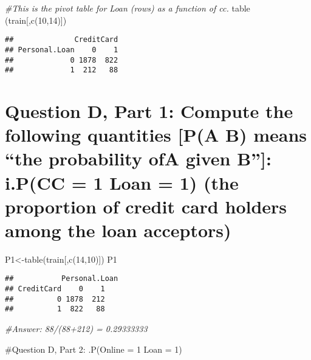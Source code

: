 \documentclass[
]{article}
\newenvironment{Shaded}{\begin{snugshade}}{\end{snugshade}}
\newcommand{\CommentTok}[1]{\textcolor[rgb]{0.56,0.35,0.01}{\textit{#1}}}
\newcommand{\DecValTok}[1]{\textcolor[rgb]{0.00,0.00,0.81}{#1}}
\newcommand{\FunctionTok}[1]{\textcolor[rgb]{0.00,0.00,0.00}{#1}}
\newcommand{\NormalTok}[1]{#1}
\newcommand{\OtherTok}[1]{\textcolor[rgb]{0.56,0.35,0.01}{#1}}
\begin{document}
\begin{Shaded}
\begin{Highlighting}[]
\CommentTok{\#This is the pivot table for Loan (rows) as a function of cc. }
\FunctionTok{table}\NormalTok{ (train[,}\FunctionTok{c}\NormalTok{(}\DecValTok{10}\NormalTok{,}\DecValTok{14}\NormalTok{)])}
\end{Highlighting}
\end{Shaded}

\begin{verbatim}
##              CreditCard
## Personal.Loan    0    1
##             0 1878  822
##             1  212   88
\end{verbatim}

\hypertarget{question-d-part-1-compute-the-following-quantities-pa-b-means-the-probability-ofa-given-b-i.pcc-1-loan-1-the-proportion-of-credit-card-holders-among-the-loan-acceptors}{%
\section{Question D, Part 1: Compute the following quantities {[}P(A
\textbar{} B) means ``the probability ofA given B''{]}: i.P(CC = 1
\textbar{} Loan = 1) (the proportion of credit card holders among the
loan
acceptors)}\label{question-d-part-1-compute-the-following-quantities-pa-b-means-the-probability-ofa-given-b-i.pcc-1-loan-1-the-proportion-of-credit-card-holders-among-the-loan-acceptors}}

\begin{Shaded}
\begin{Highlighting}[]
\NormalTok{P1}\OtherTok{\textless{}{-}}\FunctionTok{table}\NormalTok{(train[,}\FunctionTok{c}\NormalTok{(}\DecValTok{14}\NormalTok{,}\DecValTok{10}\NormalTok{)])}
\NormalTok{P1}
\end{Highlighting}
\end{Shaded}

\begin{verbatim}
##           Personal.Loan
## CreditCard    0    1
##          0 1878  212
##          1  822   88
\end{verbatim}

\begin{Shaded}
\begin{Highlighting}[]
\CommentTok{\#Answer: 88/(88+212) = 0.29333333}
\end{Highlighting}
\end{Shaded}

\#Question D, Part 2: .P(Online = 1 \textbar{} Loan = 1)
\end{document}
